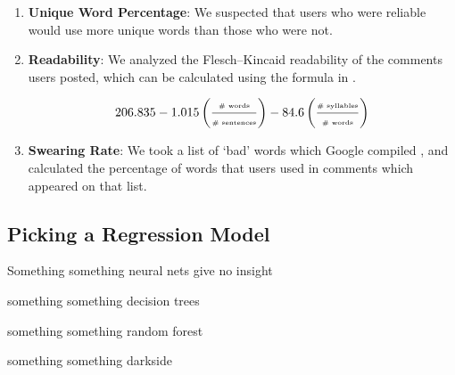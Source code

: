 \begin{enumerate}
    \item \textbf{Unique Word Percentage}: We suspected that users who were
    reliable would use more unique words than those who were not.

    \item \textbf{Readability}: We analyzed the Flesch--Kincaid readability
    \cite{kincaid1975derivation} of the comments users posted, which can be
    calculated using the formula in .

    \begin{equation} \label{eq:fk_eq}
        206.835 - 1.015 \left(\frac{\text{\tiny \# words}}{\text{\tiny \# sentences}}\right) - 84.6 \left(\frac{\text{\tiny \# syllables}}{\text{\tiny \# words}}\right)
    \end{equation}

    \item \textbf{Swearing Rate}: We took a list of `bad' words which Google
    compiled \cite{googlebadwords}, and calculated the percentage of words that
    users used in comments which appeared on that list.

\end{enumerate}





\subsection{Picking a Regression Model} %
\label{sub:picking_a_regression_model}

Something something neural nets give no insight

something something decision trees

something something random forest

something something darkside

